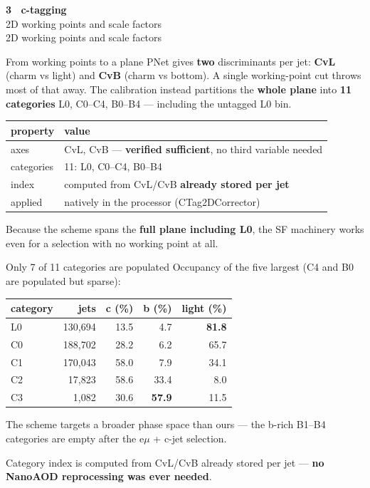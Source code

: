 \documentclass[aspectratio=169,10pt]{beamer}
\newcommand{\code}[1]{{\ttfamily\small\colorbox{codebg}{#1}}}
\newcommand{\sectionframe}[2][]{%
  \begingroup
  \setbeamercolor{background canvas}{bg=deckblue}
  \begin{frame}[plain]
    \vfill
    \begin{center}
      {\Large\bfseries\color{white} #2}\\[0.4em]
      \colorbox{deckgold}{\makebox[0.35\textwidth]{\rule{0pt}{1.2pt}}}
      \ifx\relax#1\relax\else\\[0.6em]{\color{white!80!deckblue}\small #1}\fi
    \end{center}
    \vfill
  \end{frame}
  \endgroup
}
\begin{document}
\sectionframe[2D working points and scale factors]{3 \textperiodcentered\ c-tagging}

\begin{frame}{From working points to a plane}
PNet gives \textbf{two} discriminants per jet: \textbf{CvL} (charm vs light) and
\textbf{CvB} (charm vs bottom). A single working-point cut throws most of that away.
The calibration instead partitions the \textbf{whole plane} into \textbf{11
categories} \code{L0, C0--C4, B0--B4} --- including the untagged \code{L0} bin.
\vspace{0.3em}
\begin{center}
\small
\begin{tabular}{ll}
\toprule
property & value \\
\midrule
axes & CvL, CvB --- \textbf{verified sufficient}, no third variable needed \\
categories & 11: \code{L0}, \code{C0}--\code{C4}, \code{B0}--\code{B4} \\
index & computed from CvL/CvB \textbf{already stored per jet} \\
applied & natively in the processor (\code{CTag2DCorrector}) \\
\bottomrule
\end{tabular}
\end{center}
\vspace{0.3em}
\begin{keybox}
Because the scheme spans the \textbf{full plane including \code{L0}}, the SF
machinery works even for a selection with no working point at all.
\end{keybox}
\end{frame}

\begin{frame}{Only 7 of 11 categories are populated}
{\small Occupancy of the five largest (\code{C4} and \code{B0} are populated but sparse):}
\vspace{0.3em}
\begin{center}
\small
\begin{tabular}{lrrrr}
\toprule
category & jets & c (\%) & b (\%) & light (\%) \\
\midrule
\code{L0} & 130,694 & 13.5 & 4.7 & \textbf{81.8} \\
\code{C0} & 188,702 & 28.2 & 6.2 & 65.7 \\
\code{C1} & 170,043 & 58.0 & 7.9 & 34.1 \\
\code{C2} & 17,823 & 58.6 & 33.4 & 8.0 \\
\code{C3} & 1,082 & 30.6 & \textbf{57.9} & 11.5 \\
\bottomrule
\end{tabular}
\end{center}
\vspace{0.3em}
The scheme targets a broader phase space than ours --- the b-rich \code{B1}--\code{B4}
categories are empty after the e$\mu$ + c-jet selection.
\begin{keybox}
Category index is computed from CvL/CvB already stored per jet --- \textbf{no
NanoAOD reprocessing was ever needed}.
\end{keybox}
\end{frame}
\end{document}
